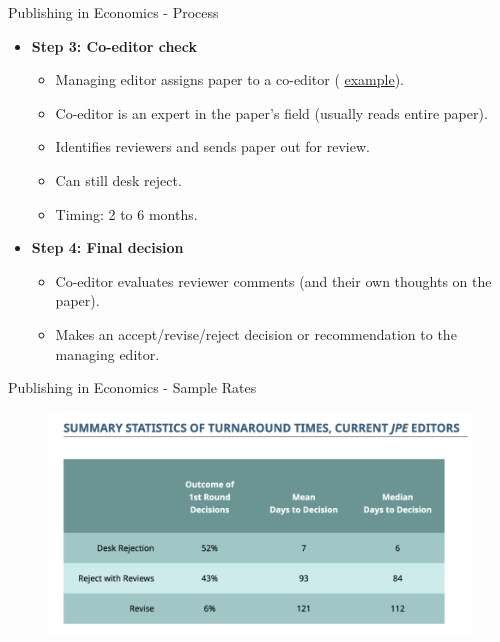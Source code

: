\documentclass{beamer}
\begin{document}
\begin{frame}{Publishing in Economics - Process}
\begin{itemize}
    \item \textbf{Step 3: Co-editor check}
    \begin{itemize}
        \item Managing editor assigns paper to a co-editor (\color{blue} \href{https://www.aeaweb.org/journals/aer/about-aer/editors}{example}\color{black}).
        \item Co-editor is an expert in the paper's field (usually reads entire paper).
        \item Identifies reviewers and sends paper out for review.
        \item Can still desk reject.
        \item Timing: 2 to 6 months.
    \end{itemize}
\medskip
    \pause \item \textbf{Step 4: Final decision}
    \begin{itemize}
        \item Co-editor evaluates reviewer comments (and their own thoughts on the paper). 
        \item Makes an accept/revise/reject decision or recommendation to the managing editor.
    \end{itemize}
\end{itemize}
\end{frame}

\begin{frame}{Publishing in Economics - Sample Rates}
    \begin{figure}
        \includegraphics[scale=0.55]{images/jpe.png}
    \end{figure}      
\end{frame}
\end{document}
